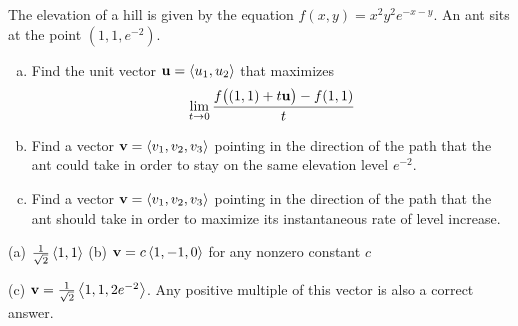 \begin{question}[M200 2003D] %
The elevation of a hill is given by the equation 
$f(x,y)=x^2y^2e^{-x-y}$. An ant sits at the point $(1,1,e^{-2})$.
\begin{enumerate}[(a)]
\item 
Find the unit vector $\mathbf{u}=\left< u_1,u_2\right>$ that maximizes
\begin{equation*}
\lim_{t\rightarrow 0}\frac{f\big((1,1)+t\mathbf{u}\big)-f(1,1)}{t}
\end{equation*}

\item 
Find a vector $\mathbf{v}=\left< v_1,v_2,v_3\right>$ pointing in the direction
of the path that the ant could take in order to stay on the same elevation
level $e^{-2}$.

\item Find a vector $\mathbf{v}=\left< v_1,v_2,v_3\right>$ pointing in the direction
of the path that the ant should take in order to maximize its instantaneous
rate of level increase.
\end{enumerate}
\end{question}

%

\begin{answer}
(a) $\frac{1}{\sqrt{2}}\left< 1,1\right>$\qquad
(b) $\mathbf{v}=c\left< 1,-1,0\right>$ for any nonzero constant $c$

(c) $\mathbf{v}=\frac{1}{\sqrt{2}}\left< 1,1,2e^{-2}\right>$. Any positive multiple
of this vector is also a correct answer.
\end{answer}

